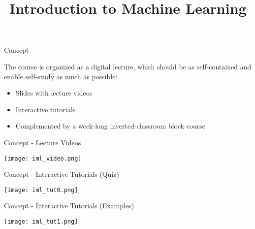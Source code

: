 \documentclass[10pt]{beamer}
\title{Introduction to Machine Learning}
\begin{document}
\maketitle

\begin{frame}{Concept}

The course is organized as a digital lecture, which should be as self-contained and enable self-study as much as possible:

  \begin{itemize}
    \item
      Slides with lecture videos

    \item
      Interactive tutorials

    \item
       Complemented by a week-long inverted-classroom block course

  \end{itemize}

\end{frame}

\begin{frame}{Concept - Lecture Videos}

  \begin{center}
  \texttt{[image: iml\_video.png]}
  \end{center}

\end{frame}

\begin{frame}{Concept - Interactive Tutorials (Quiz)}

  \begin{center}
  \texttt{[image: iml\_tut0.png]}
  \end{center}

\end{frame}

\begin{frame}{Concept - Interactive Tutorials (Examples)}

  \begin{center}
  \texttt{[image: iml\_tut1.png]}
  \end{center}

\end{frame}
\end{document}
